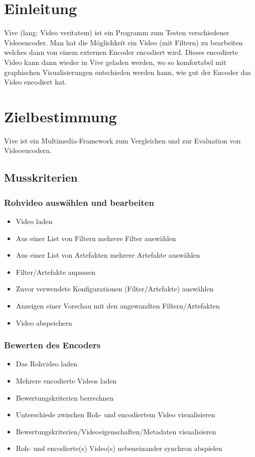 \documentclass[parskip=full]{scrartcl}
\author {Carina Weber, Jan Benedikt Schwarz, Johannes Werner, Noel Schuhmacher,\\
Sascha Rapp, Simon Grafenhorst}
\begin{document}
\maketitle
\thispagestyle{empty}
\newpage
\tableofcontents
\newpage
\section*{Einleitung}
Vive (lang: Video veritatem) ist ein Programm zum Testen verschiedener Videoencoder. Man hat die Möglichkeit ein Video (mit Filtern) zu bearbeiten welches dann von einem externen Encoder encodiert wird. Dieses encodierte Video kann dann wieder in Vive geladen werden, wo so komfortabel mit graphischen Visualisierungen entschieden werden kann, wie gut der Encoder das Video encodiert hat.
\newpage
\section{Zielbestimmung}
Vive ist ein Multimedia-Framework zum Vergleichen und zur Evaluation von Videoencodern.
\subsection{Musskriterien}
\subsubsection{Rohvideo auswählen und bearbeiten}
\begin{itemize}
\item Video laden
\item Aus einer List von Filtern mehrere Filter auswählen
\item Aus einer List von Artefakten mehrere Artefakte auswählen
\item Filter/Artefakte anpassen
\item Zuvor verwendete Konfigurationen (Filter/Artefakte) auswählen
\item Anzeigen einer Vorschau mit den angewandten Filtern/Artefakten
\item Video abspeichern
\end{itemize}
\subsubsection{Bewerten des Encoders}
\begin{itemize}
\item Das Rohvideo laden
\item Mehrere encodierte Videos laden
\item Bewertungskriterien berrechnen
\item Unterschiede zwischen Roh- und encodiertem Video visualisieren
\item Bewertungskriterien/Videoeigenschaften/Metadaten visualisieren
\item Roh- und encodierte(s) Video(s) nebeneinander synchron abspielen
\end{itemize}
\newpage
\end{document}
